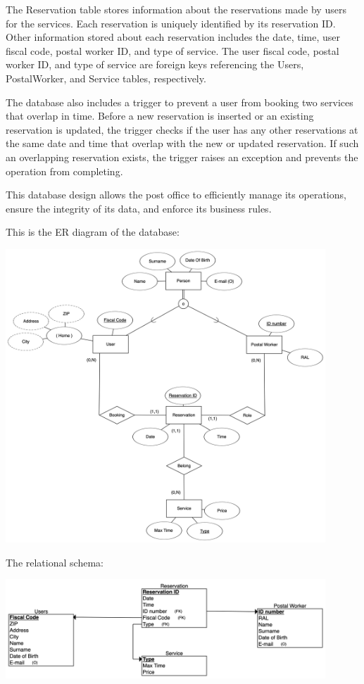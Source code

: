 \documentclass{article}
\begin{document}
The Reservation table stores information about the reservations made by users for the services. Each reservation is uniquely identified by its reservation ID\@. Other information stored about each reservation includes the date, time, user fiscal code, postal worker ID, and type of service. The user fiscal code, postal worker ID, and type of service are foreign keys referencing the Users, PostalWorker, and Service tables, respectively.

The database also includes a trigger to prevent a user from booking two services that overlap in time. Before a new reservation is inserted or an existing reservation is updated, the trigger checks if the user has any other reservations at the same date and time that overlap with the new or updated reservation. If such an overlapping reservation exists, the trigger raises an exception and prevents the operation from completing.

This database design allows the post office to efficiently manage its operations, ensure the integrity of its data, and enforce its business rules.

This is the ER diagram of the database:
\begin{center}
\includegraphics[width=12cm]{images/PostOfficeERdiagram.png}
\end{center}

The relational schema:
\begin{center}
\includegraphics[width=12cm]{images/relationalSchema.png}
\end{center}
\end{document}
